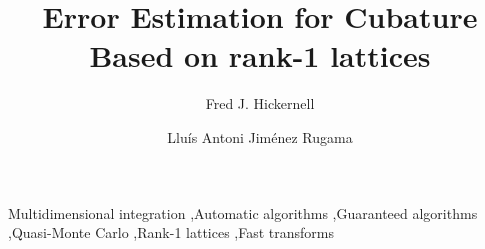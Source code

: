 \documentclass[]{elsarticle}
\theoremstyle{definition}
\begin{document}
\begin{frontmatter}

\title{Error Estimation for Cubature Based on rank-1 lattices}
\author{Fred J. Hickernell}
\address{Room E1-208, Department of Applied Mathematics, Illinois Institute of Technology,\\ 10 W.\ 32$^{\text{nd}}$ St., Chicago, IL 60616}
\author{Llu\'{i}s Antoni Jim\'{e}nez Rugama}
\address{Room E1-120, Department of Applied Mathematics, Illinois Institute of Technology,\\ 10 W.\ 32$^{\text{nd}}$ St., Chicago, IL 60616}
\begin{abstract}
%
%
%

\end{abstract}

\begin{keyword}
Multidimensional integration \sep Automatic algorithms \sep Guaranteed algorithms \sep Quasi-Monte Carlo \sep Rank-1 lattices \sep Fast transforms


\end{keyword}
\end{frontmatter}
\end{document}
